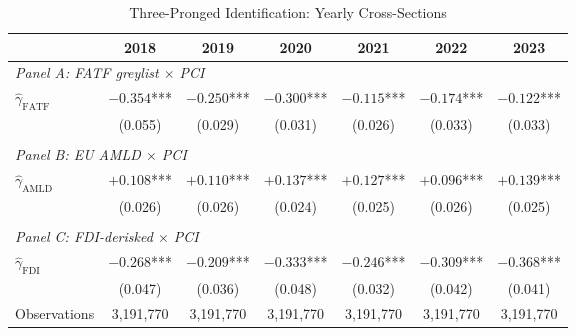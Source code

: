 \begin{table}[htbp]
\centering
\caption{Three-Pronged Identification: Yearly Cross-Sections}
\label{tab:yearly_three_pronged}
\begin{threeparttable}
\small
\begin{tabular}{lcccccc}
\toprule
                              & 2018       & 2019       & 2020       & 2021       & 2022       & 2023       \\
\midrule
\multicolumn{7}{l}{\textit{Panel A: FATF greylist $\times$ PCI}} \\
\midrule
$\hat{\gamma}_{\text{FATF}}$  & $-0.354$***& $-0.250$***& $-0.300$***& $-0.115$***& $-0.174$***& $-0.122$***\\
                              & (0.055)    & (0.029)    & (0.031)    & (0.026)    & (0.033)    & (0.033)    \\
\\[0.3em]
\multicolumn{7}{l}{\textit{Panel B: EU AMLD $\times$ PCI}} \\
\midrule
$\hat{\gamma}_{\text{AMLD}}$  & $+0.108$***& $+0.110$***& $+0.137$***& $+0.127$***& $+0.096$***& $+0.139$***\\
                              & (0.026)    & (0.026)    & (0.024)    & (0.025)    & (0.026)    & (0.025)    \\
\\[0.3em]
\multicolumn{7}{l}{\textit{Panel C: FDI-derisked $\times$ PCI}} \\
\midrule
$\hat{\gamma}_{\text{FDI}}$   & $-0.268$***& $-0.209$***& $-0.333$***& $-0.246$***& $-0.309$***& $-0.368$***\\
                              & (0.047)    & (0.036)    & (0.048)    & (0.032)    & (0.042)    & (0.041)    \\
\midrule
Observations                  & 3,191,770  & 3,191,770  & 3,191,770  & 3,191,770  & 3,191,770  & 3,191,770  \\
\bottomrule
\end{tabular}
\begin{tablenotes}
\end{tablenotes}
\end{threeparttable}
\end{table}

